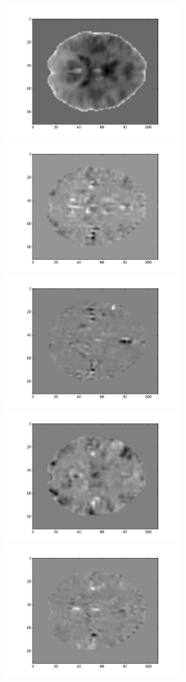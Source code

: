 \documentclass[12pt]{article}
\begin{document}
\begin{housevseverything}
    \centering
      \includegraphics[width=0.5\textwidth]{projection_0}
      \includegraphics[width=0.5\textwidth]{projection_1}
      \includegraphics[width=0.5\textwidth]{projection_2}
      \includegraphics[width=0.5\textwidth]{projection_3}
      \includegraphics[width=0.5\textwidth]{projection_4}

\end{housevseverything}
\end{document}

